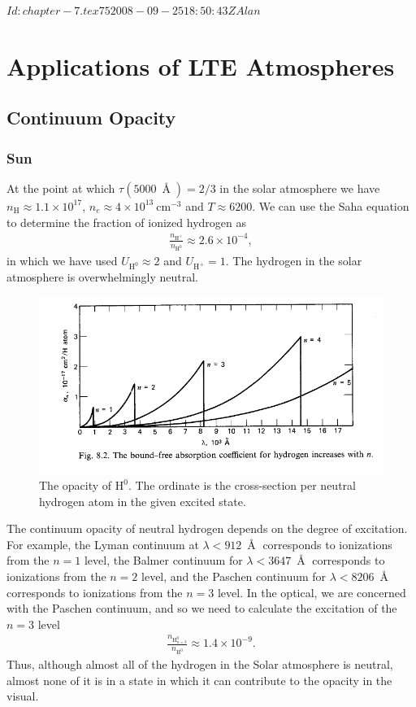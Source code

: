 
\svnInfo $Id: chapter-7.tex 75 2008-09-25 18:50:43Z Alan $

\chapter{Applications of LTE Atmospheres}

\section{Continuum Opacity}

\subsection{Sun}

At the point at which $\tau(5000\:{\Angstrom}) = 2/3$ in the
solar atmosphere we have $n_\mathrm{H} \approx 1.1 \times
10^{17}$, $n_e \approx 4 \times 10^{13}\:\mathrm{cm^{-3}}$
and $T \approx 6200$. We can use the Saha equation to
determine the fraction of ionized hydrogen as
\begin{align}
\frac{n_\mathrm{H^+}}{n_\mathrm{H^0}}
\approx 
2.6 \times 10^{-4},
\end{align}
in which we have used $U_\mathrm{H^0} \approx 2$ and
$U_\mathrm{H^+} = 1$. The hydrogen in the solar atmosphere
is overwhelmingly neutral. 

\begin{figure}
\centering
\includegraphics[width=0.7\linewidth]{figures/h-zero.pdf}
\caption{The opacity of $\mathrm{H}^0$. The ordinate is the cross-section per neutral hydrogen atom in the given excited state.}
\end{figure}

The continuum opacity of neutral hydrogen depends on the
degree of excitation. For example, the Lyman continuum at
$\lambda < 912\:{\Angstrom}$ corresponds to ionizations from
the $n=1$ level, the Balmer continuum for $\lambda <
3647\:{\Angstrom}$ corresponds to ionizations from the $n=2$
level, and the Paschen continuum for $\lambda <
8206\:{\Angstrom}$ corresponds to ionizations from the $n=3$
level. In the optical, we are concerned with the Paschen
continuum, and so we need to calculate the excitation of the
$n=3$ level
\begin{align}
\frac{n_{\mathrm{H}^0_{n=3}}}{n_{\mathrm{H^0}}}
\approx
1.4 \times 10^{-9}.
\end{align}
Thus, although almost all of the hydrogen in the Solar
atmosphere is neutral, almost none of it is in a state in
which it can contribute to the opacity in the visual.

